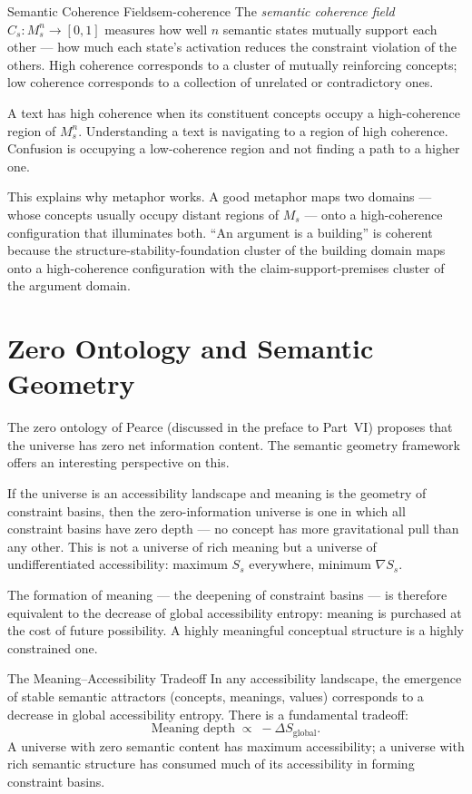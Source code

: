 \begin{definition}{Semantic Coherence Field}{sem-coherence}
  The \emph{semantic coherence field} $C_s : M_s^n \to [0,1]$ measures
  how well $n$ semantic states mutually support each other — how much
  each state's activation reduces the constraint violation of the others.
  High coherence corresponds to a cluster of mutually reinforcing concepts;
  low coherence corresponds to a collection of unrelated or contradictory ones.
\end{definition}

A text has high coherence when its constituent concepts occupy a
high-coherence region of $M_s^n$. Understanding a text is navigating
to a region of high coherence. Confusion is occupying a low-coherence
region and not finding a path to a higher one.

This explains why metaphor works. A good metaphor maps two domains
— whose concepts usually occupy distant regions of $M_s$ — onto a
high-coherence configuration that illuminates both. ``An argument is
a building'' is coherent because the structure-stability-foundation
cluster of the building domain maps onto a high-coherence configuration
with the claim-support-premises cluster of the argument domain.

\section{Zero Ontology and Semantic Geometry}

The zero ontology of Pearce (discussed in the preface to Part~VI)
proposes that the universe has zero net information content. The
semantic geometry framework offers an interesting perspective on this.

If the universe is an accessibility landscape and meaning is the
geometry of constraint basins, then the zero-information universe
is one in which all constraint basins have zero depth — no concept
has more gravitational pull than any other. This is not a universe
of rich meaning but a universe of undifferentiated accessibility:
maximum $S_s$ everywhere, minimum $\nabla S_s$.

The formation of meaning — the deepening of constraint basins — is
therefore equivalent to the decrease of global accessibility entropy:
meaning is purchased at the cost of future possibility. A highly
meaningful conceptual structure is a highly constrained one.

\begin{namedthm}{The Meaning–Accessibility Tradeoff}
  In any accessibility landscape, the emergence of stable semantic
  attractors (concepts, meanings, values) corresponds to a decrease
  in global accessibility entropy. There is a fundamental tradeoff:
  \[
    \text{Meaning depth} \;\propto\; -\Delta S_{\text{global}}.
  \]
  A universe with zero semantic content has maximum accessibility;
  a universe with rich semantic structure has consumed much of its
  accessibility in forming constraint basins.
\end{namedthm}

